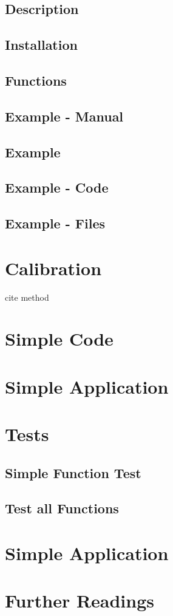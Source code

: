 \subsection{Description}

\subsection{Installation}

\subsection{Functions}

\subsection{Example - Manual}

\subsection{Example}

\subsection{Example - Code}

\subsection{Example - Files}



\section{Calibration}

cite method

\section{Simple Code}


\section{Simple Application}



\section{Tests}

\subsection{Simple Function Test}

\subsection{Test all Functions}

\section{Simple Application}


\section{Further Readings}

